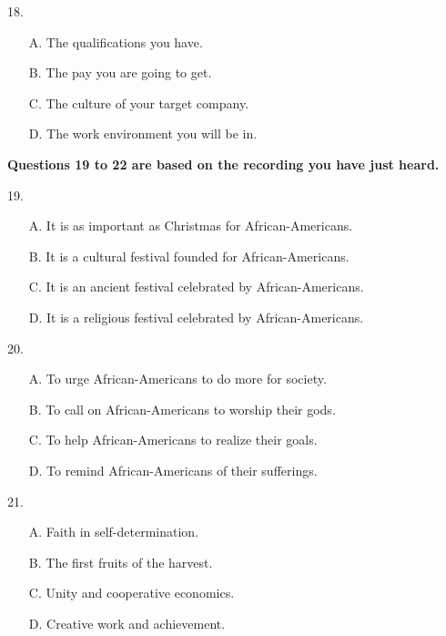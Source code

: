 \documentclass[UTF8,11pt]{ctexart}
\begin{document}
18.


\begin{itemize}[leftmargin=2em,itemsep=.2em,topsep=.4em]\item[A.] The qualifications you have.
\item[B.] The pay you are going to get.
\item[C.] The culture of your target company.
\item[D.] The work environment you will be in.
\end{itemize}

\textbf{Questions 19 to 22 are based on the recording you have just heard.}


19.


\begin{itemize}[leftmargin=2em,itemsep=.2em,topsep=.4em]\item[A.] It is as important as Christmas for African-Americans.
\item[B.] It is a cultural festival founded for African-Americans.
\item[C.] It is an ancient festival celebrated by African-Americans.
\end{itemize}

\begin{itemize}[leftmargin=2em,itemsep=.2em,topsep=.4em]\item[D.] It is a religious festival celebrated by African-Americans.
\end{itemize}

20.


\begin{itemize}[leftmargin=2em,itemsep=.2em,topsep=.4em]\item[A.] To urge African-Americans to do more for society.
\item[B.] To call on African-Americans to worship their gods.
\item[C.] To help African-Americans to realize their goals.
\item[D.] To remind African-Americans of their sufferings.
\end{itemize}

21.


\begin{itemize}[leftmargin=2em,itemsep=.2em,topsep=.4em]\item[A.] Faith in self-determination.
\item[B.] The first fruits of the harvest.
\item[C.] Unity and cooperative economics.
\item[D.] Creative work and achievement.
\end{itemize}
\end{document}
